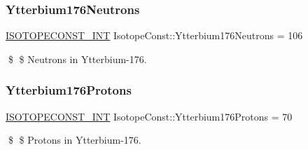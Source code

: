 \subsubsection{\texorpdfstring{Ytterbium176\+Neutrons}{Ytterbium176Neutrons}}
{\footnotesize\ttfamily \mbox{\hyperlink{group___isotope_const-_macros_ga5f18360b3e99483a35c32d789e62621c}{I\+S\+O\+T\+O\+P\+E\+C\+O\+N\+S\+T\+\_\+\+I\+NT}} Isotope\+Const\+::\+Ytterbium176\+Neutrons = 106}

\$ \$ Neutrons in Ytterbium-\/176. \mbox{\label{group___isotope_const-_ytterbium-_yb176_ga44d7abe7a1f06c7082166410375a1ba9}} 
\subsubsection{\texorpdfstring{Ytterbium176\+Protons}{Ytterbium176Protons}}
{\footnotesize\ttfamily \mbox{\hyperlink{group___isotope_const-_macros_ga5f18360b3e99483a35c32d789e62621c}{I\+S\+O\+T\+O\+P\+E\+C\+O\+N\+S\+T\+\_\+\+I\+NT}} Isotope\+Const\+::\+Ytterbium176\+Protons = 70}

\$ \$ Protons in Ytterbium-\/176. 